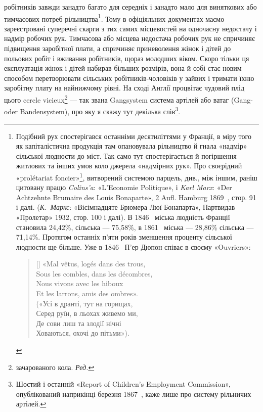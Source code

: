 робітників завжди занадто багато для середніх і занадто мало для
виняткових або тимчасових потреб рільництва\footnote{
Подібний рух спостерігався останніми десятиліттями у Франції,
в міру того як капіталістична продукція там опановувала рільництво й
гнала «надмір» сільської людности до міст. Так само тут спостерігається
й погіршення житлових та інших умов коло джерела «надмірних рук».
Про своєрідний «prolétariat foncier»\footnote*{
сільський пролетаріят. \emph{Ред.}
}, витворений системою парцель, див.,
між іншим, раніш цитовану працю \emph{Colins’a}: «L’Economie Politique», і
\emph{Karl Marx}: «Der Achtzehnte Brumaire des Louis Bonaparte», 2 Aufl.
Hamburg 1869~, стор. 91 і далі. (\emph{К.~Маркс}: «Вісімнадцяте Брюмера Люї
Бонапарта», Партвидав «Пролетар» 1932, стор. 100 і далі). В 1846~
міська людність Франції становила 24,42\%, сільська — 75,58\%, в 1861~
міська — 28,86\% сільська — 71,14\%. Протягом останніх п’яти років
зменшення проценту сільської людности ще більше. Уже в 1846~ П’ер
Дюпон співає в своєму «Ouvriers»:

\settowidth{\versewidth}{Sous les combles, dans les décombres,}
\begin{verse}[\versewidth]
«Mal vêtus, logés dans des trous,\\
Sous les combles, dans les décombres,\\
Nous vivons avec les hiboux\\
Et les larrons, amis des ombres».\\
\smallskip
(«Усі в дранті, тут на горищах,\\
Серед руїн, в льохах живемо ми,\\
Де сови лиш та злодії нічні\\
Ховаються, охочі до пітьми»).\\
\end{verse}
}. Тому в офіціяльних
документах маємо зареєстровані суперечні скарги з
тих самих місцевостей на одночасну недостачу і надмір робочих
рук. Тимчасова або місцева недостача робочих рук не спричиняє
підвищення заробітної плати, а спричиняє приневолення жінок
і дітей до польових робіт і вживання робітників, щораз молодших
віком. Скоро тільки ця експлуатація жінок і дітей набирав
більших розмірів, вона й собі стає новим способом перетворювати
сільських робітників-чоловіків у зайвих і тримати їхню
заробітну плату на найнижчому рівні. На сході Англії процвітає
чудовий плід цього cercle vicieux\footnote*{
зачарованого кола. \emph{Ред.}
} — так звана Gangsystem
система артілей або ватаг (Gang-oder Bandensystem), про яку
я скажу тут декілька слів\footnote{
Шостий і останній «Report of Children’s Employment Commission»,
опублікований наприкінці березня 1867~, каже лише про систему
рільничих артілей.
}.

